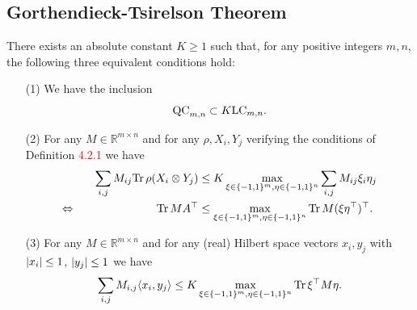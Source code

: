 \subsection{Gorthendieck-Tsirelson Theorem}\frame{\tableofcontents[currentsubsection]}
	\begin{frame}
		\begin{theo}
			There exists an absolute constant $K\geq 1$ such that, for any positive integers $m,n$, the following three equivalent conditions hold:
			\begin{itemize}
				\item[(1)] We have the inclusion 
					\begin{equation}
						\textup{QC}_{m,n} \subset K\textup{LC}_{m,n}.
					\end{equation}
				\item[(2)] For any $M\in\mathbb{R}^{m\times n}$ and for any $\rho,X_i,Y_j$ verifying the conditions of Definition \textcolor{red}{4.2.1} we have
					\begin{align}
						\sum_{i,j} M_{ij} \textup{Tr} \, {\rho(X_i\otimes Y_j)}  &\leq K \max_{\xi\in\{-1,1\}^m,\eta\in\{-1,1\}^n} \sum_{i,j} M_{ij}\xi_i\eta_j \\
						\Leftrightarrow \hspace{2.5cm} \textup{Tr} \, {MA^\top}  &\leq \max_{\xi\in\{-1,1\}^m,\eta\in\{-1,1\}^n} \textup{Tr} \, {M(\xi\eta^\top)^\top} .
					\end{align}
					\item[(3)] For any $M\in\mathbb{R}^{m\times n}$ and for any (real) Hilbert space vectors $x_i,y_j$ with ${\left|{x_i}\right|}\leq 1$, ${\left|{y_j}\right|}\leq 1$ we have
						\begin{equation}
							\sum_{i,j} M_{i,j}\langle{x_i},{y_j}\rangle \leq K \max_{\xi\in\{-1,1\}^m,\eta\in\{-1,1\}^n} \textup{Tr} \, {\xi^\top M \eta} . \label{eq:G_ineq}
						\end{equation}
			\end{itemize}
		\end{theo}
	\end{frame}
